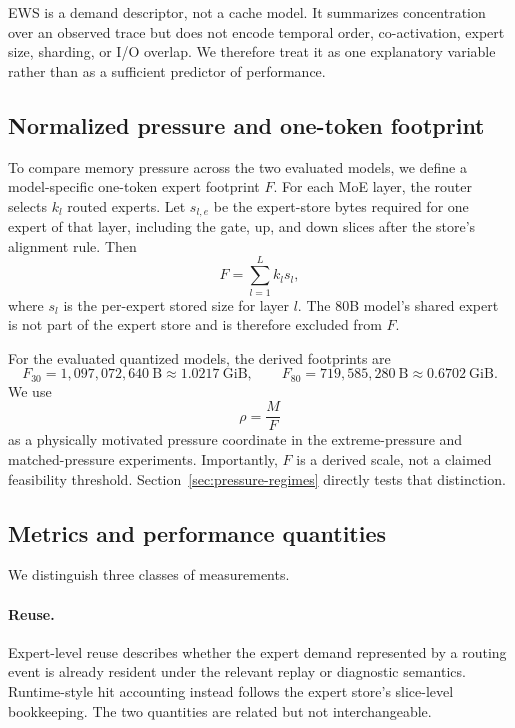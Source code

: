 EWS is a demand descriptor, not a cache model. It summarizes concentration over an observed trace but does not encode temporal order, co-activation, expert size, sharding, or I/O overlap. We therefore treat it as one explanatory variable rather than as a sufficient predictor of performance.

\subsection{Normalized pressure and one-token footprint}

To compare memory pressure across the two evaluated models, we define a model-specific one-token expert footprint $F$. For each MoE layer, the router selects $k_l$ routed experts. Let $s_{l,e}$ be the expert-store bytes required for one expert of that layer, including the gate, up, and down slices after the store's alignment rule. Then
\begin{equation}
    F
    =
    \sum_{l=1}^{L} k_l s_l ,
    \label{eq:footprint}
\end{equation}
where $s_l$ is the per-expert stored size for layer $l$. The 80B model's shared expert is not part of the expert store and is therefore excluded from $F$.

For the evaluated quantized models, the derived footprints are
\begin{equation}
    F_{30}=1{,}097{,}072{,}640~\mathrm{B}
    \approx 1.0217~\mathrm{GiB},
    \qquad
    F_{80}=719{,}585{,}280~\mathrm{B}
    \approx 0.6702~\mathrm{GiB}.
    \label{eq:footprints}
\end{equation}
We use
\begin{equation}
    \rho = \frac{M}{F}
    \label{eq:normalized-pressure}
\end{equation}
as a physically motivated pressure coordinate in the extreme-pressure and matched-pressure experiments. Importantly, $F$ is a derived scale, not a claimed feasibility threshold. Section~\ref{sec:pressure-regimes} directly tests that distinction.

\subsection{Metrics and performance quantities}

We distinguish three classes of measurements.

\paragraph{Reuse.}
Expert-level reuse describes whether the expert demand represented by a routing event is already resident under the relevant replay or diagnostic semantics. Runtime-style hit accounting instead follows the expert store's slice-level bookkeeping. The two quantities are related but not interchangeable.

